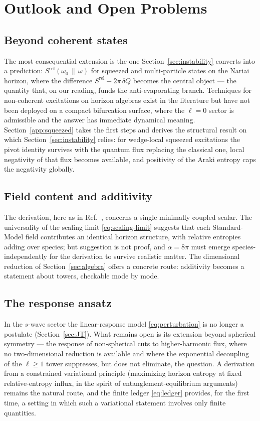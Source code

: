 \documentclass[11pt]{article}
\newcommand{\Srel}{S^{\mathrm{rel}}}
\newcommand{\Nariai}{Nariai}
\begin{document}
\section{Outlook and Open Problems}
\label{sec:outlook}

\subsection{Beyond coherent states}

The most consequential extension is the one Section~\ref{sec:instability} converts into a prediction: $\Srel(\omega_0\,\|\,\omega)$ for squeezed and multi-particle states on the \Nariai{} horizon, where the difference $\Srel - 2\pi\,\delta Q$ becomes the central object --- the quantity that, on our reading, funds the anti-evaporating branch. Techniques for non-coherent excitations on horizon algebras exist in the literature but have not been deployed on a compact bifurcation surface, where the $\ell = 0$ sector is admissible and the answer has immediate dynamical meaning. Section~\ref{app:squeezed} takes the first steps and derives the structural result on which Section~\ref{sec:instability} relies: for wedge-local squeezed excitations the pivot identity survives with the quantum flux replacing the classical one, local negativity of that flux becomes available, and positivity of the Araki entropy caps the negativity globally.

\subsection{Field content and additivity}

The derivation, here as in Ref.~\cite{DorauMuch}, concerns a single minimally coupled scalar. The universality of the scaling limit \eqref{eq:scaling-limit} suggests that each Standard-Model field contributes an identical horizon structure, with relative entropies adding over species; but suggestion is not proof, and $\alpha = 8\pi$ must emerge species-independently for the derivation to survive realistic matter. The dimensional reduction of Section~\ref{sec:algebra} offers a concrete route: additivity becomes a statement about towers, checkable mode by mode.

\subsection{The response ansatz}

In the $s$-wave sector the linear-response model \eqref{eq:perturbation} is no longer a postulate (Section~\ref{sec:JT}). What remains open is its extension beyond spherical symmetry --- the response of non-spherical cuts to higher-harmonic flux, where no two-dimensional reduction is available and where the exponential decoupling of the $\ell \ge 1$ tower suppresses, but does not eliminate, the question. A derivation from a constrained variational principle (maximizing horizon entropy at fixed relative-entropy influx, in the spirit of entanglement-equilibrium arguments) remains the natural route, and the finite ledger \eqref{eq:ledger} provides, for the first time, a setting in which such a variational statement involves only finite quantities.
\end{document}
